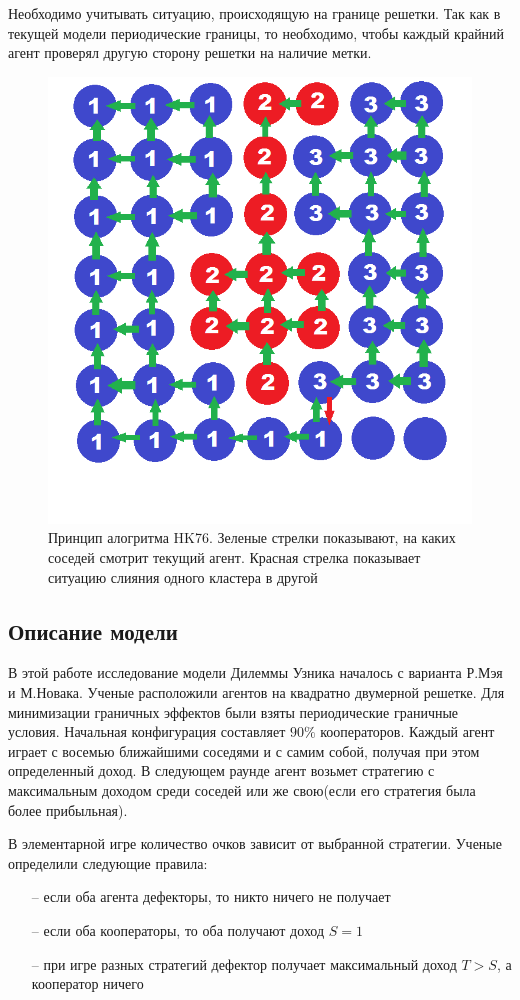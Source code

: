 \documentclass[a4paper]{article}
\begin{document}
	\par Необходимо учитывать ситуацию, происходящую на границе решетки. Так как в текущей модели периодические границы, то необходимо, чтобы каждый крайний агент проверял другую сторону решетки на наличие метки.
	\begin{figure}[H]
		\centering
		\includegraphics[width=0.5\linewidth]{HKpic2.png}
		\caption{Принцип алогритма HK76. Зеленые стрелки показывают, на каких соседей смотрит текущий агент. Красная стрелка показывает ситуацию слияния одного кластера в другой}
		\label{hkpic}
	\end{figure}
	
	
	\subsection{Описание модели}
	\par В этой работе исследование модели Дилеммы Узника началось с варианта Р.Мэя и М.Новака\cite{may_nowak92}. Ученые расположили агентов на квадратно двумерной решетке. Для минимизации граничных эффектов были взяты периодические граничные условия. Начальная конфигурация составляет $90\%$ кооператоров. Каждый агент играет с восемью ближайшими соседями и с самим собой, получая при этом определенный доход. В следующем раунде агент возьмет стратегию с максимальным доходом среди соседей или же свою(если его стратегия была более прибыльная).
	
	\par В элементарной игре количество очков зависит от выбранной стратегии. Ученые определили следующие правила:
	\begin{itemize}
		\item[--] если оба агента дефекторы, то никто ничего не получает
		\item[--] если оба кооператоры, то оба получают доход $S=1$
		\item[--] при игре разных стратегий дефектор получает максимальный доход $T>S$, а кооператор ничего
	\end{itemize}
	
\end{document}
